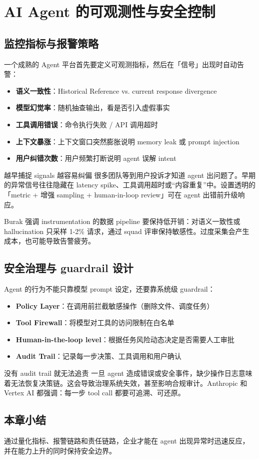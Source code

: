 \section{AI Agent 的可观测性与安全控制}

\subsection{监控指标与报警策略}

一个成熟的 Agent 平台首先要定义可观测指标，然后在「信号」出现时自动告警：

\begin{itemize}
    \item \textbf{语义一致性}：Historical Reference vs. current response divergence
    \item \textbf{模型幻觉率}：随机抽查输出，看是否引入虚假事实
    \item \textbf{工具调用错误}：命令执行失败 / API 调用超时
    \item \textbf{上下文暴涨}：上下文窗口突然膨胀说明 memory leak 或 prompt injection
    \item \textbf{用户纠错次数}：用户频繁打断说明 agent 误解 intent
\end{itemize}

\begin{knowledgebox}{越早捕捉 signals 越容易纠偏}
很多团队等到用户投诉才知道 agent 出问题了。早期的异常信号往往隐藏在 latency spike、工具调用超时或“内容重复”中。设置透明的「metric + 增强 sampling + human-in-loop review」可在 agent 出错前升级响应。
\end{knowledgebox}

Burak 强调 instrumentation 的数据 pipeline 要保持低开销：对语义一致性或 hallucination 只采样 1-2\% 请求，通过 squad 评审保持敏感性。过度采集会产生成本，也可能导致告警疲劳。

\subsection{安全治理与 guardrail 设计}

Agent 的行为不能只靠模型 prompt 设定，还要靠系统级 guardrail：

\begin{itemize}
    \item \textbf{Policy Layer}：在调用前拦截敏感操作（删除文件、调度任务）
    \item \textbf{Tool Firewall}：将模型对工具的访问限制在白名单
    \item \textbf{Human-in-the-loop level}：根据任务风险动态决定是否需要人工审批
    \item \textbf{Audit Trail}：记录每一步决策、工具调用和用户确认
\end{itemize}

\begin{warningbox}{没有 audit trail 就无法追责}
一旦 agent 造成错误或安全事件，缺少操作日志意味着无法恢复决策链。这会导致治理系统失效，甚至影响合规审计。Anthropic 和 Vertex AI 都强调：每一步 tool call 都要可追溯、可还原。
\end{warningbox}

\subsection{本章小结}

通过量化指标、报警链路和责任链路，企业才能在 agent 出现异常时迅速反应，并在能力上升的同时保持安全边界。

